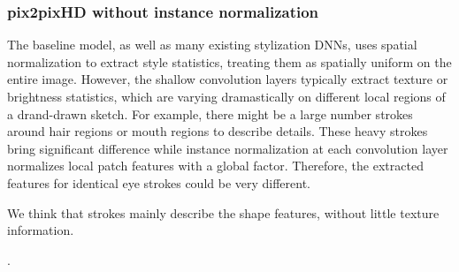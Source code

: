 

\subsubsection{pix2pixHD without instance normalization}
The baseline model, as well as many existing stylization DNNs, uses spatial normalization to extract style statistics, treating them as spatially uniform on the entire image. 
However, the shallow convolution layers typically extract texture or brightness statistics, which are varying dramastically on different local regions of a drand-drawn sketch. For example, there might be a large number strokes around hair regions or mouth regions to describe details. These heavy strokes bring significant difference while instance normalization at each convolution layer normalizes local patch features with a global factor. Therefore, the extracted features for identical eye strokes could be very different. 

We think that strokes mainly describe the shape features, without little texture information. 


%






. 